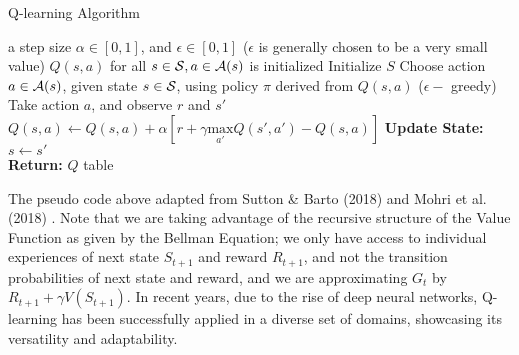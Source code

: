 \begin{algorithm}
\caption{Q-learning Algorithm}\label{Q-learning}
\begin{algorithmic}
\Require a step size  $\alpha \in [0,1]$, and $\epsilon \in [0,1]$ ($\epsilon$ is generally chosen to be a very small value)
\Ensure $Q(s,a)$ for all $s \in \mathcal{S}, a \in \mathcal A(s)$ is initialized
\State Initialize $S$
    \State Choose action $a \in \mathcal A(s)$, given state $s \in \mathcal{S}$, using policy $\pi$ derived from $Q(s,a)$ 
    \State ($\epsilon-$ greedy)
    \State Take action  $a$, and observe $r$ and $s'$
    \State $Q(s,a) \leftarrow
    Q(s,a) + \alpha
    \left [
    r + \gamma \underset{a'}{\text{max}}
    Q(s',a') - Q(s, a)
    \right]$
    \State \textbf{Update State:} $s \leftarrow s'$
    \EndFor {} \\
    \textbf{Return:} $Q$ table 
\end{algorithmic}
\end{algorithm}
The pseudo code above adapted from Sutton \& Barto (2018) \cite{RL} and Mohri et al. (2018) \cite{mohri2018}.
Note that we are taking advantage of the recursive structure of the Value Function as given by the Bellman Equation; we only have access to individual experiences of next state $S_{t+1}$ and reward $R_{t+1}$, and not the transition probabilities of next state and  reward, and we are approximating $G_t$ by $R_{t+1} + \gamma V(S_{t+1})$. 
In recent years, due to the rise of deep neural networks, Q-learning has been successfully applied in a diverse set of domains, showcasing its versatility and adaptability. 
